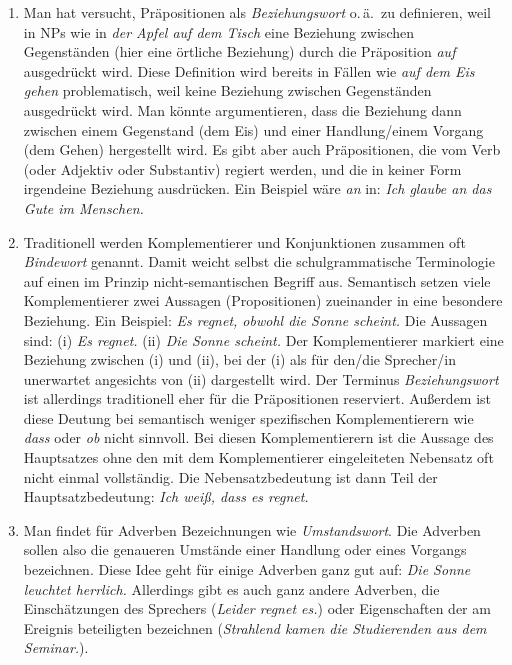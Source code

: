 \begin{enumerate}\Lf
  \item Man hat versucht, Präpositionen als \textit{Beziehungswort} o.\,ä.\ zu definieren, weil in NPs wie in \textit{der Apfel auf dem Tisch} eine Beziehung zwischen Gegenständen (hier eine örtliche Beziehung) durch die Präposition \textit{auf} ausgedrückt wird.
    Diese Definition wird bereits in Fällen wie \textit{auf dem Eis gehen} problematisch, weil keine Beziehung zwischen Gegenständen ausgedrückt wird.
    Man könnte argumentieren, dass die Beziehung dann zwischen einem Gegenstand (dem Eis) und einer Handlung\slash einem Vorgang (dem Gehen) hergestellt wird.
    Es gibt aber auch Präpositionen, die vom Verb (oder Adjektiv oder Substantiv) regiert werden, und die in keiner Form irgendeine Beziehung ausdrücken.
    Ein Beispiel wäre \textit{an} in: \textit{Ich glaube an das Gute im Menschen.}
  \item Traditionell werden Komplementierer und Konjunktionen zusammen oft \textit{Bindewort} genannt.
    Damit weicht selbst die schulgrammatische Terminologie auf einen im Prinzip nicht-semantischen Begriff aus.
    Semantisch setzen viele Komplementierer zwei Aussagen (Propositionen) zueinander in eine besondere Beziehung.
    Ein Beispiel: \textit{Es regnet, obwohl die Sonne scheint.}
    Die Aussagen sind: (i) \textit{Es regnet.} (ii) \textit{Die Sonne scheint.}
    Der Komplementierer markiert eine Beziehung zwischen (i) und (ii), bei der (i) als für den\slash die Sprecher\slash in unerwartet angesichts von (ii) dargestellt wird.
    Der Terminus \textit{Beziehungswort} ist allerdings traditionell eher für die Präpositionen reserviert.
    Außerdem ist diese Deutung bei semantisch weniger spezifischen Komplementierern wie \textit{dass} oder \textit{ob} nicht sinnvoll.
    Bei diesen Komplementierern ist die Aussage des Hauptsatzes ohne den mit dem Komplementierer eingeleiteten Nebensatz oft nicht einmal vollständig.
    Die Nebensatzbedeutung ist dann Teil der Hauptsatzbedeutung: \textit{Ich weiß, dass es regnet.} 
  \item Man findet für Adverben Bezeichnungen wie \textit{Umstandswort}.
    Die Adverben sollen also die genaueren Umstände einer Handlung oder eines Vorgangs bezeichnen.
    Diese Idee geht für einige Adverben ganz gut auf:
    \textit{Die Sonne leuchtet herrlich.}
    Allerdings gibt es auch ganz andere Adverben, die \zB Einschätzungen des Sprechers (\textit{Leider regnet es.}) oder Eigenschaften der am Ereignis beteiligten bezeichnen (\textit{Strahlend kamen die Studierenden aus dem Seminar.}).
\end{enumerate}

